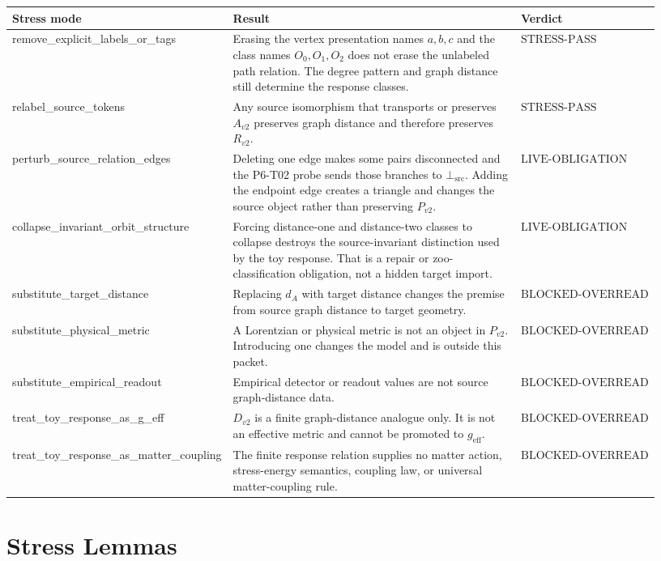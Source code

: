 \documentclass[11pt]{article}
\newcommand{\StressPass}{\mathrm{STRESS}\mbox{-}\mathrm{PASS}}
\newcommand{\LiveObligation}{\mathrm{LIVE}\mbox{-}\mathrm{OBLIGATION}}
\newcommand{\BlockedOverread}{\mathrm{BLOCKED}\mbox{-}\mathrm{OVERREAD}}
\newcommand{\BottomSrc}{\bot_{\mathrm{src}}}
\begin{document}
\begin{longtable}{p{0.29\linewidth}p{0.50\linewidth}p{0.14\linewidth}}
\toprule
Stress mode & Result & Verdict \\
\midrule
remove\_explicit\_labels\_or\_tags &
Erasing the vertex presentation names \(a,b,c\) and the class names
\(O_0,O_1,O_2\) does not erase the unlabeled path relation. The degree pattern
and graph distance still determine the response classes. & \(\StressPass\) \\
relabel\_source\_tokens &
Any source isomorphism that transports or preserves \(A_{v2}\) preserves graph
distance and therefore preserves \(R_{v2}\). & \(\StressPass\) \\
perturb\_source\_relation\_edges &
Deleting one edge makes some pairs disconnected and the P6-T02 probe sends
those branches to \(\BottomSrc\). Adding the endpoint edge creates a triangle
and changes the source object rather than preserving \(P_{v2}\). &
\(\LiveObligation\) \\
collapse\_invariant\_orbit\_structure &
Forcing distance-one and distance-two classes to collapse destroys the
source-invariant distinction used by the toy response. That is a repair or
zoo-classification obligation, not a hidden target import. &
\(\LiveObligation\) \\
substitute\_target\_distance &
Replacing \(d_A\) with target distance changes the premise from source graph
distance to target geometry. & \(\BlockedOverread\) \\
substitute\_physical\_metric &
A Lorentzian or physical metric is not an object in \(P_{v2}\). Introducing
one changes the model and is outside this packet. & \(\BlockedOverread\) \\
substitute\_empirical\_readout &
Empirical detector or readout values are not source graph-distance data. &
\(\BlockedOverread\) \\
treat\_toy\_response\_as\_g\_eff &
\(D_{v2}\) is a finite graph-distance analogue only. It is not an effective
metric and cannot be promoted to \(g_{\mathrm{eff}}\). & \(\BlockedOverread\) \\
treat\_toy\_response\_as\_matter\_coupling &
The finite response relation supplies no matter action, stress-energy
semantics, coupling law, or universal matter-coupling rule. &
\(\BlockedOverread\) \\
\bottomrule
\end{longtable}

\section{Stress Lemmas}
\end{document}
